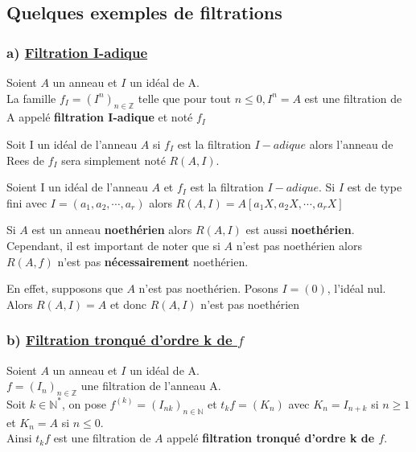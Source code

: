 \subsection{Quelques exemples de filtrations}
\subsubsection{a) \underline{Filtration I-adique}}
\begin{madefinition}
	Soient $A$ un anneau et $I$ un idéal de A.\\
	La famille $f_I = (I^n)_{n\in \mathbb{Z}}$ telle que pour tout $n \leqslant 0, I^n = A$ est une filtration de A appelé \textbf{filtration I-adique} et noté $f_I$
\end{madefinition}
Soit I un idéal de l'anneau $A$ si $f_I$ est la filtration $I-adique$ alors l'anneau de Rees de $f_I$ sera simplement noté $R(A,I)$.
\begin{maproposition}
	Soient I un idéal de l'anneau $A$ et $f_I$ est la filtration $I-adique$.
	Si $I$ est de type fini avec $I = (a_1, a_2, \cdots, a_r)$ alors $R(A,I) = A[a_1X,a_2X, \cdots, a_rX] $
\end{maproposition}
\begin{maconsequence}
	Si $A$ est un anneau \textbf{noethérien} alors $R(A,I)$ est aussi \textbf{noethérien}. \\
	Cependant, il est important de noter que si $A$ n'est pas noethérien alors $R(A,f)$ n'est pas \textbf{nécessairement} noethérien.
\end{maconsequence}
\begin{monexemple}
	En effet, supposons que $A$ n'est pas noethérien.
	Posons $I = (0)$, l'idéal nul. Alors $R(A,I) = A$ et donc $R(A,I)$ n'est pas noethérien
\end{monexemple}


\subsubsection{b) \underline{Filtration tronqué d'ordre k de $f$}}
\begin{madefinition}
	Soient $A$ un anneau et $I$ un idéal de A.\\
	$f = (I_n)_{n\in \mathbb{Z}}$ une filtration de l'anneau A.\\
	Soit $k \in \mathbb{N}^{*}$, on pose $f^{(k)} = (I_{nk})_{n\in \mathbb{N}}$ et $t_{k}f=(K_n)$ avec $K_n = I_{n+k}$ si $n \geqslant 1 $ et $K_n = A$ si $n \leqslant 0$.\\
	Ainsi $t_{k}f$ est une filtration de $A$ appelé \textbf{filtration tronqué d'ordre k de $f$}.
\end{madefinition}

